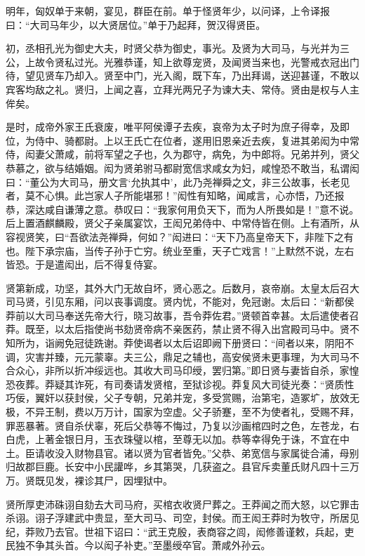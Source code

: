 \documentclass[12pt,UTF8]{ctexbook}
\begin{document}
明年，匈奴单于来朝，宴见，群臣在前。单于怪贤年少，以问译，上令译报曰：“大司马年少，以大贤居位。”单于乃起拜，贺汉得贤臣。



初，丞相孔光为御史大夫，时贤父恭为御史，事光。及贤为大司马，与光并为三公，上故令贤私过光。光雅恭谨，知上欲尊宠贤，及闻贤当来也，光警戒衣冠出门待，望见贤车乃却入。贤至中门，光入阁，既下车，乃出拜谒，送迎甚谨，不敢以宾客均敌之礼。贤归，上闻之喜，立拜光两兄子为谏大夫、常侍。贤由是权与人主侔矣。



是时，成帝外家王氏衰废，唯平阿侯谭子去疾，哀帝为太子时为庶子得幸，及即位，为侍中、骑都尉。上以王氏亡在位者，遂用旧恩亲近去疾，复进其弟闳为中常侍，闳妻父萧咸，前将军望之子也，久为郡守，病免，为中郎将。兄弟并列，贤父恭慕之，欲与结婚姻。闳为贤弟驸马都尉宽信求咸女为妇，咸惶恐不敢当，私谓闳曰：“董公为大司马，册文言‘允执其中’，此乃尧禅舜之文，非三公故事，长老见者，莫不心惧。此岂家人子所能堪邪！”闳性有知略，闻咸言，心亦悟，乃还报恭，深达咸自谦薄之意。恭叹曰：“我家何用负天下，而为人所畏如是！”意不说。后上置酒麒麟殿，贤父子亲属宴饮，王闳兄弟侍中、中常侍皆在侧。上有酒所，从容视贤笑，曰“吾欲法尧禅舜，何如？”闳进曰：“天下乃高皇帝天下，非陛下之有也。陛下承宗庙，当传子孙于亡穷。统业至重，天子亡戏言！”上默然不说，左右皆恐。于是遣闳出，后不得复侍宴。



贤第新成，功坚，其外大门无故自坏，贤心恶之。后数月，哀帝崩。太皇太后召大司马贤，引见东厢，问以丧事调度。贤内忧，不能对，免冠谢。太后曰：“新都侯莽前以大司马奉送先帝大行，晓习故事，吾令莽佐君。”贤顿首幸甚。太后遣使者召莽。既至，以太后指使尚书劾贤帝病不亲医药，禁止贤不得入出宫殿司马中。贤不知所为，诣阙免冠徒跣谢。莽使谒者以太后诏即阙下册贤曰：“间者以来，阴阳不调，灾害并臻，元元蒙辜。夫三公，鼎足之辅也，高安侯贤未更事理，为大司马不合众心，非所以折冲绥远也。其收大司马印绶，罢归第。”即日贤与妻皆自杀，家惶恐夜葬。莽疑其诈死，有司奏请发贤棺，至狱诊视。莽复风大司徒光奏：“贤质性巧佞，翼奸以获封侯，父子专朝，兄弟并宠，多受赏赐，治第宅，造冢圹，放效无极，不异王制，费以万万计，国家为空虚。父子骄蹇，至不为使者礼，受赐不拜，罪恶暴著。贤自杀伏辜，死后父恭等不悔过，乃复以沙画棺四时之色，左苍龙，右白虎，上著金银日月，玉衣珠璧以棺，至尊无以加。恭等幸得免于诛，不宜在中土。臣请收没入财物县官。诸以贤为官者皆免。”父恭、弟宽信与家属徙合浦，母别归故郡巨鹿。长安中小民讙哗，乡其第哭，几获盗之。县官斥卖董氏财凡四十三万万。贤既见发，裸诊其尸，因埋狱中。



贤所厚吏沛硃诩自劾去大司马府，买棺衣收贤尸葬之。王莽闻之而大怒，以它罪击杀诩。诩子浮建武中贵显，至大司马、司空，封侯。而王闳王莽时为牧守，所居见纪，莽败乃去官。世祖下诏曰：“武王克殷，表商容之闾，闳修善谨敕，兵起，吏民独不争其头首。今以闳子补吏。”至墨绶卒官。萧咸外孙云。
\end{document}
